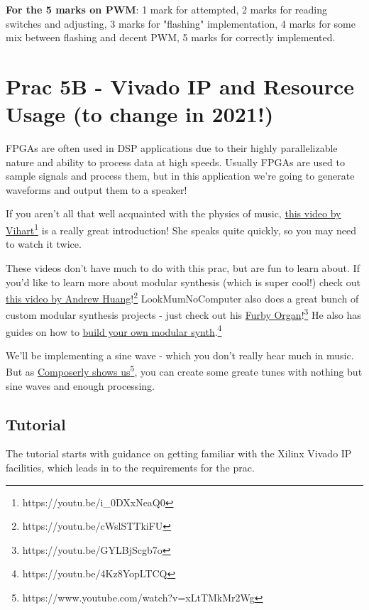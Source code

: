\textbf{For the 5 marks on PWM}: 1 mark for attempted, 2 marks for reading switches and adjusting, 3 marks for "flashing" implementation, 4 marks for some mix between flashing and decent PWM, 5 marks for correctly implemented.





\section{Prac 5B - Vivado IP and Resource Usage (to change in 2021!)}
\label{sec:Prac5}
FPGAs are often used in DSP applications due to their highly parallelizable nature and ability to process data at high speeds. Usually FPGAs are used to sample signals and process them, but in this application we're going to generate waveforms and output them to a speaker!

If you aren't all that well acquainted with the physics of music, \href{https://www.youtube.com/watch?v=i_0DXxNeaQ0}{this video by Vihart}\footnote{https://youtu.be/i\_0DXxNeaQ0} is a really great introduction! She speaks quite quickly, so you may need to watch it twice.

These videos don't have much to do with this prac, but are fun to learn about. If you'd like to learn more about modular synthesis (which is super cool!) check out \href{https://www.youtube.com/watch?v=cWslSTTkiFU}{this video by Andrew Huang}!\footnote{https://youtu.be/cWslSTTkiFU} LookMumNoComputer also does a great bunch of custom modular synthesis projects - just check out his \href{https://youtu.be/GYLBjScgb7o}{Furby Organ}!\footnote{https://youtu.be/GYLBjScgb7o} He also has guides on how to \href{https://www.youtube.com/watch?v=4Kz8YopLTCQ&list=PLluPQLh1xzlIzqgTBwTo_a5k_O63JxwjQ}{build your own modular synth}.\footnote{https://youtu.be/4Kz8YopLTCQ}

We'll be implementing a sine wave - which you don't really hear much in music. But as \href{https://www.youtube.com/watch?v=xLtTMkMr2Wg}{Composerly shows us}\footnote{https://www.youtube.com/watch?v=xLtTMkMr2Wg}, you can create some greate tunes with nothing but sine waves and enough processing.

\subsection{Tutorial}
The tutorial starts with guidance on getting familiar with the Xilinx Vivado IP facilities, which leads in to the requirements for the prac. 

